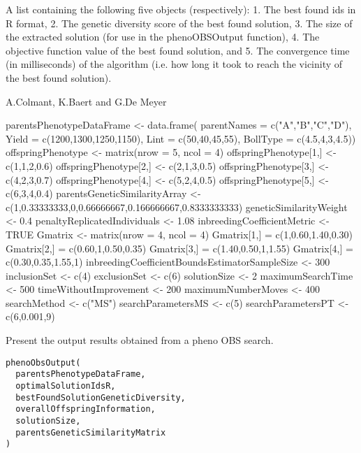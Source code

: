 \documentclass[a4paper]{book}
\begin{document}
%
\begin{Value}
A list containing the following five objects (respectively): 
1. The best found ids in R format,
2. The genetic diversity score of the best found solution,
3. The size of the extracted solution (for use in the phenoOBSOutput function),
4. The objective function value of the best found solution, and 
5. The convergence time (in milliseconds) of the algorithm (i.e. how long it took to reach the vicinity of the best found solution).
\end{Value}
%
\begin{Author}\relax
A.Colmant, K.Baert and G.De Meyer
\end{Author}
%
\begin{Examples}
\begin{ExampleCode}
parentsPhenotypeDataFrame <- data.frame(
parentNames = c("A","B","C","D"),
Yield = c(1200,1300,1250,1150),
Lint = c(50,40,45,55),
BollType = c(4.5,4,3,4.5))
offspringPhenotype <- matrix(nrow = 5, ncol = 4)
offspringPhenotype[1,] <- c(1,1,2,0.6)
offspringPhenotype[2,] <- c(2,1,3,0.5)
offspringPhenotype[3,] <- c(4,2,3,0.7)
offspringPhenotype[4,] <- c(5,2,4,0.5)
offspringPhenotype[5,] <- c(6,3,4,0.4)
parentsGeneticSimilarityArray <- c(1,0.33333333,0,0.66666667,0.166666667,0.8333333333)
geneticSimilarityWeight <- 0.4
penaltyReplicatedIndividuals <- 1.08
inbreedingCoefficientMetric <- TRUE
Gmatrix <- matrix(nrow = 4, ncol = 4)
Gmatrix[1,] = c(1,0.60,1.40,0.30)
Gmatrix[2,] = c(0.60,1,0.50,0.35)
Gmatrix[3,] = c(1.40,0.50,1,1.55)
Gmatrix[4,] = c(0.30,0.35,1.55,1)
inbreedingCoefficientBoundsEstimatorSampleSize <- 300
inclusionSet <- c(4)
exclusionSet <- c(6)
solutionSize <- 2
maximumSearchTime <- 500
timeWithoutImprovement <- 200
maximumNumberMoves <- 400
searchMethod <- c("MS")
searchParametersMS <- c(5)
searchParametersPT <- c(6,0.001,9)

\end{ExampleCode}
\end{Examples}
%
\begin{Description}\relax
Present the output results obtained from a pheno OBS search.
\end{Description}
%
\begin{Usage}
\begin{verbatim}
phenoObsOutput(
  parentsPhenotypeDataFrame,
  optimalSolutionIdsR,
  bestFoundSolutionGeneticDiversity,
  overallOffspringInformation,
  solutionSize,
  parentsGeneticSimilarityMatrix
)
\end{verbatim}
\end{Usage}
\end{document}
